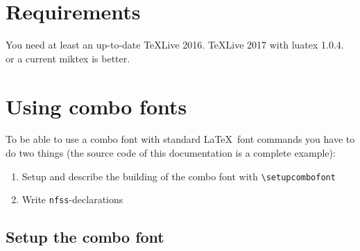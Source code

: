 \documentclass[parskip=half-,egregdoesnotlikesansseriftitles]{scrartcl}
\begin{document}
\section{Requirements}
You need at least an up-to-date TeXLive 2016. TeXLive 2017 with luatex 1.0.4. or a current miktex is better.


\section{Using combo fonts}

To be able to use a combo font with standard \LaTeX\ font commands you have to do two things (the source code of this documentation is a complete example):

\begin{enumerate}
\item Setup and describe the building of the combo font with \verb+\setupcombofont+

\item Write \texttt{nfss}-declarations 
\end{enumerate}

\subsection{Setup the combo font}

\DescribeMacro{}
\end{document}
